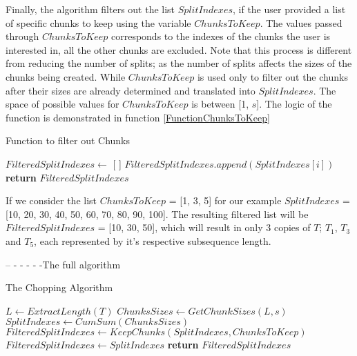 Finally, the algorithm filters out the list $SplitIndexes$, if the user provided a list of specific chunks to keep using the variable $ChunksToKeep$.
The values passed through $ChunksToKeep$ corresponds to the indexes of the chunks the user is interested in, all the other chunks are excluded.
Note that this process is different from reducing the number of splits; as the number of splits affects the sizes of the chunks being created.
While $ChunksToKeep$ is used only to filter out the chunks after their sizes are already determined and translated into $SplitIndexes$.
The space of possible values for $ChunksToKeep$ is between [1, $s$]. The logic of the function is demonstrated in function \ref{FunctionChunksToKeep}

\begin{algorithm}
    \caption{Function to filter out Chunks}\label{FunctionChunksToKeep}
    \begin{algorithmic}[1]
      \State $FilteredSplitIndexes \gets$ [ ]
                \State $FilteredSplitIndexes.append(SplitIndexes[i])$
        \EndFor
        \State \textbf{return} $FilteredSplitIndexes$
      \EndFunction
    \end{algorithmic}
\end{algorithm}

If we consider the list $ChunksToKeep$ = [1, 3, 5] for our example $SplitIndexes$ = [10, 20, 30, 40, 50, 60, 70, 80, 90, 100].
The resulting filtered list will be $FilteredSplitIndexes$ = [10, 30, 50], which will result in only 3 copies of $T$; $T_{1}$, $T_{3}$ and $T_{5}$,
each represented by it's respective subsequence length.

 -- - - - - -The full algorithm

\begin{algorithm}
    \caption{The Chopping Algorithm}\label{AlgorithmChopping}
    \begin{algorithmic}[1]
        \State $L \gets ExtractLength(T)$
        \State $ChunksSizes \gets GetChunkSizes(L,s)$
        \State $SplitIndexes \gets CumSum(ChunksSizes)$
                \State $FilteredSplitIndexes \gets KeepChunks(SplitIndexes,ChunksToKeep)$
            \Else
                \State $FilteredSplitIndexes \gets SplitIndexes$
            \EndIf
        \State \textbf{return} $FilteredSplitIndexes$
      \EndFunction
    \end{algorithmic}
\end{algorithm}

